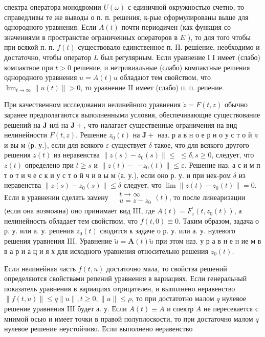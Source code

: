 \documentclass[10pt]{article}
\begin{document}
спектра оператора монодромии $U(\omega)$ с единичной окружностью счетно, то справедливы те же выводы о п. п. решения, к-рые сформулированы выше для однородного уравнения. Если $A(t)$ почти периодичен (как функция со значениями в пространстве ограниченных операторов в $E$ ), то для того чтобы при всякой п. п. $f(t)$ существовало единственное п. П. решіение, необходимо и достаточно, чтобы оператор $L$ был регулярным. Если уравнение I I имеет (слабо) компактное при $t>0$ решение, и нетривиальные (слабо) компактные решения однородного уравнения $\dot{u}=A(t) u$ обладают тем свойством, что $\lim _{t \rightarrow \infty}\|u(t)\|>0$, то уравнение II имеет (слабо) п. п. репение.



При качественном исследовании нелинейного уравнения $\dot{z}=F(t, z)$ обычно заранее предполагаются выполненными условия, обеспечивающие существование решений на $\boldsymbol{J}$ илі на $\boldsymbol{J}+$, что налагает существенные ограничения на вид нелинейности $F(t, z)$. Решение $z_{0}(t)$ на $\boldsymbol{J}+$ наз. р а в н о е р н о у с т о й ч и вы м (р. у.), если для всякого $\varepsilon$ существует $\delta$ такое, что для всякого другого решения $z(t)$ из неравенства $\left\|z(s)-z_{0}(s)\right\| \leqslant$ $\leqslant \delta, s \geqslant 0$, следует, что $z(t)$ определено при $t \geqslant s$ и $\| z(t)-$ $-z_{0}(t) \| \leqslant \varepsilon$. Решение наз. а с и м п т о т и ч е с к и у с т о й ч и в ы м (а. у.), если оно р. у. и при нек-ром $\delta$ из неравенства $\left\|z(s)-z_{0}(s)\right\| \leqslant \delta$ следует, что $\lim \left\|z(t)-z_{0}(t)\right\|=0$. Если в уравнении сделать замену $\begin{aligned} & t \rightarrow \infty \\ & u=z-z_{0}\end{aligned}(t)$, то после линеаризации (если она возможна) оно принимает вид III, где $A(t)=F_{z}^{\prime}\left(t, z_{0}(t)\right)$, а нелинейность обладает тем свойством, что $f(t, 0) \equiv 0$. Таким образом, задача о р. у. или а. у. репения $z_{0}(t)$ сводится к задаче о р. у. или а. у. нулевого решения уравнения III. Уравнение $\dot{\tilde{u}}=\boldsymbol{A}(t) \tilde{u}$ при этом наз. у р а в н е н ие м в в а р и а ц и я х для исходного уравнения относительно решения $z_{0}(t)$.



Если нелинейная часть $f(t, u)$ достаточно мала, то свойства решений определяются свойствами репений уравнения в вариациях. Если генеральный показатель уравнения в вариациях отрицателен, и выполнено неравенство $\|f(t, u)\| \leqslant q\|u\|, t \geqslant 0,\|u\| \leqslant \rho$, то при достатотно малом $q$ нулевое решение уравнения III будет а. у. Если $A(t) \equiv A$ и спектр $A$ не пересекается с мнимой осью и имеет точки в правой полуплоскости, то при достаточно малом $q$ нулевое решение неустойчиво. Если выполнено неравенство
\end{document}
